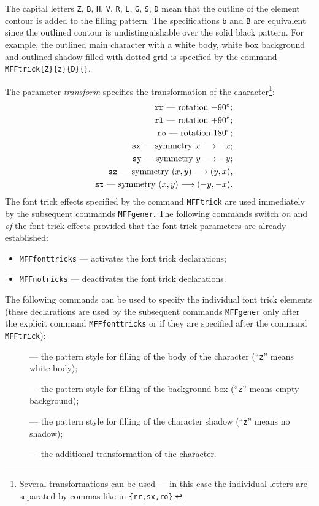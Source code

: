 The capital letters {\tt Z}, {\tt B}, {\tt H}, {\tt V}, {\tt R},
{\tt L}, {\tt G}, {\tt S}, {\tt D}
mean that the outline of the element contour
is added to the filling pattern.
The specifications {\tt b} and {\tt B}
are equivalent since the outlined contour is undistinguishable
over the solid black pattern.
For example, the outlined main character
with a white body, white box background and
outlined shadow filled with dotted grid is specified by the command
{\tt \bs{}MFFtrick\{Z\}\{z\}\{D\}\{\}}.

The parameter {\em transform} specifies the transformation
of the character\footnote{Several transformations can be used
--- in this case the individual letters are separated by commas
like in {\tt\{rr,sx,ro\}}.}:
\begin{eqnarray*}
&&\hbox{{\tt rr} --- rotation $-90^{\circ}$;}\\
&&\hbox{{\tt rl} --- rotation $+90^{\circ}$;}\\
&&\hbox{{\tt ro} --- rotation $180^{\circ}$;}\\
&&\hbox{{\tt sx} --- symmetry $x \longrightarrow -x$;}\\
&&\hbox{{\tt sy} --- symmetry $y \longrightarrow -y$;}\\
&&\hbox{{\tt sz} --- symmetry $(x,y) \longrightarrow (y,x)$,}\\
&&\hbox{{\tt st} --- symmetry $(x,y) \longrightarrow (-y,-x)$.}
\end{eqnarray*}
The font trick effects specified by the command {\tt\bs{}MFFtrick}
are used immediately by the subsequent commands {\tt\bs{}MFFgener}.
The following commands switch {\em on} and {\em of}
the font trick effects provided that the font trick
parameters are already established:
\begin{itemize}
\item[] {\tt \bs{}MFFfonttricks} --- activates
        the font trick declarations;
\item[] {\tt \bs{}MFFnotricks} --- deactivates
        the font trick declarations.
\end{itemize}
The following commands can be used to specify the individual
font trick elements (these declarations are used by the subsequent
commands {\tt\bs{}MFFgener} only after the explicit
command {\tt\bs{}MFFfonttricks} or if they are specified after the
command {\tt\bs{}MFFtrick}):
\begin{description}
\item[] --- the pattern style
        for filling of the body of the character (``{\tt z}'' means white body);
\item[] --- the pattern style
        for filling of the background box (``{\tt z}'' means empty background);
\item[] --- the pattern style
        for filling of the character shadow (``{\tt z}'' means no shadow);
\item[]
        --- the additional transformation of the character.
\end{description}
